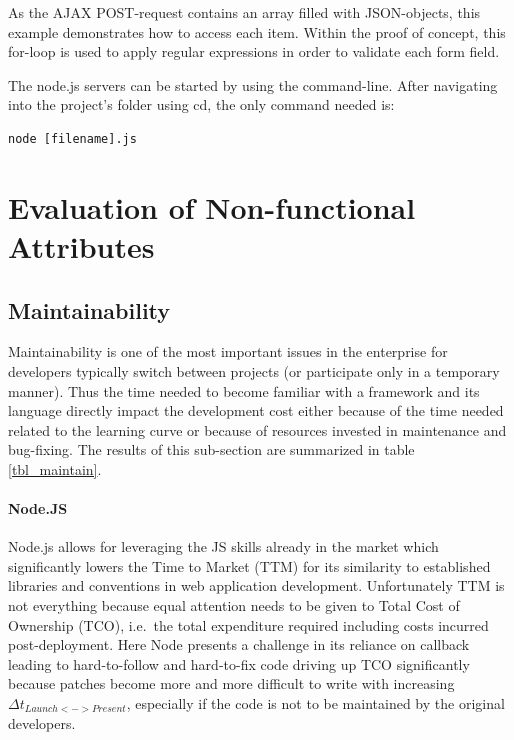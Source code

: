As the AJAX POST-request contains an array filled with JSON-objects, this example demonstrates how to access each item. Within the proof of concept, this for-loop is used to apply regular expressions in order to validate each form field.

The node.js servers can be started by using the command-line. After navigating into the project’s folder using cd, the only command needed is:
\begin{lstlisting}[caption={Executing Node.js code}]
node [filename].js
\end{lstlisting}


\newpage
\section{Evaluation of Non-functional Attributes}
\label{evaluation_nonfunctional}

\subsection{Maintainability}
\label{maintainability}
Maintainability is one of the most important issues in the enterprise for developers typically switch between projects (or participate only in a temporary manner). Thus the time needed to become familiar with a framework and its language directly impact the development cost either because of the time needed related to the learning curve or because of resources invested in maintenance and bug-fixing.
The results of this sub-section are summarized in table \ref{tbl_maintain}.\\

\paragraph{Node.JS}
Node.js allows for leveraging the JS skills already in the market which significantly lowers the Time to Market (TTM) for its similarity to established libraries and conventions in web application development. Unfortunately TTM is not everything because equal attention needs to be given to Total Cost of Ownership (TCO), i.e.\ the total expenditure required including costs incurred post-deployment. Here Node presents a challenge in its reliance on callback leading to hard-to-follow and hard-to-fix code driving up TCO significantly because patches become more and more difficult to write with increasing $\Delta t_{Launch<->Present}$, especially if the code is not to be maintained by the original developers.


